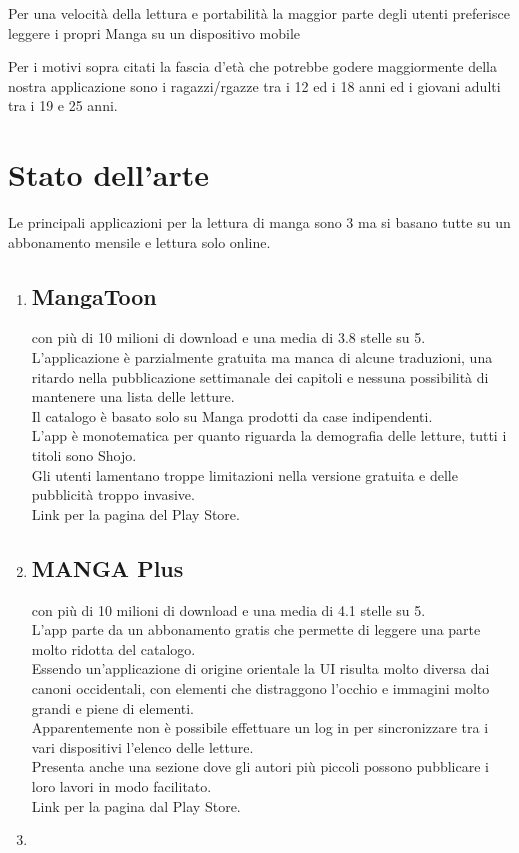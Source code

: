 \documentclass{report}
\begin{document}
Per una velocità della lettura e portabilità la maggior parte degli
utenti preferisce leggere i propri Manga su un dispositivo mobile\cite{NLTreport}

Per i motivi sopra citati la fascia d'età che potrebbe godere
maggiormente della nostra applicazione sono i ragazzi/rgazze tra i 12 ed
i 18 anni ed i giovani adulti tra i 19 e 25 anni.

\section{Stato dell'arte}

Le principali applicazioni per la lettura di manga sono 3 ma si basano
tutte su un abbonamento mensile e lettura solo online.

\begin{enumerate}
	\def\labelenumi{\arabic{enumi}.}
	\item
	      \subsection{MangaToon} con più di 10 milioni di download e una media di 3.8 stelle su 5.\\
	      L'applicazione è parzialmente gratuita ma manca di alcune traduzioni, una ritardo nella pubblicazione settimanale dei capitoli e nessuna possibilità di mantenere una lista delle letture.\\
	      Il catalogo è basato solo su Manga prodotti da case indipendenti.\\
	      L'app è monotematica per quanto riguarda la demografia delle letture, tutti i titoli sono Shojo\cite{shooManga}.\\
	      Gli utenti lamentano troppe limitazioni nella versione gratuita e delle pubblicità troppo invasive.\\
	      Link per la pagina del Play Store.
	\item
	      \subsection{MANGA Plus}con più di 10 milioni di download e una media di 4.1 stelle su 5.\\
	      L'app parte da un abbonamento gratis che permette di leggere una parte molto ridotta del catalogo.\\
	      Essendo un'applicazione di origine orientale la UI risulta molto diversa dai canoni occidentali, con elementi che distraggono l'occhio e immagini molto grandi e piene di elementi.\\
	      Apparentemente non è possibile effettuare un log in per sincronizzare tra i vari dispositivi l'elenco delle letture.\\
	      Presenta anche una sezione dove gli autori più piccoli possono pubblicare i loro lavori in modo facilitato.\\
	      Link per la pagina dal Play Store.
	\item

\end{enumerate}
\end{document}
